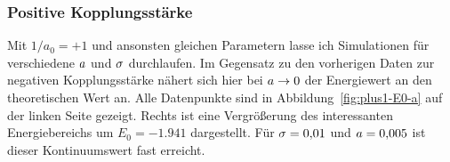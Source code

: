 \FloatBarrier
\subsubsection{Positive Kopplungsstärke}

Mit $1/a_0 = +1$ und ansonsten gleichen Parametern lasse ich Simulationen für
verschiedene $a$ und $\sigma$ durchlaufen. Im Gegensatz zu den
vorherigen Daten zur negativen Kopplungsstärke nähert sich hier bei $a
\to 0$ der Energiewert an den theoretischen Wert an. Alle Datenpunkte sind in
Abbildung~\ref{fig:plus1-E0-a} auf der linken Seite gezeigt. Rechts ist eine
Vergrößerung des interessanten Energiebereichs um $E_0 = \num{-1.941}$
dargestellt. Für $\sigma = \num{0.01}$ und $a = \num{0.005}$ ist
dieser Kontinuumswert fast erreicht.


